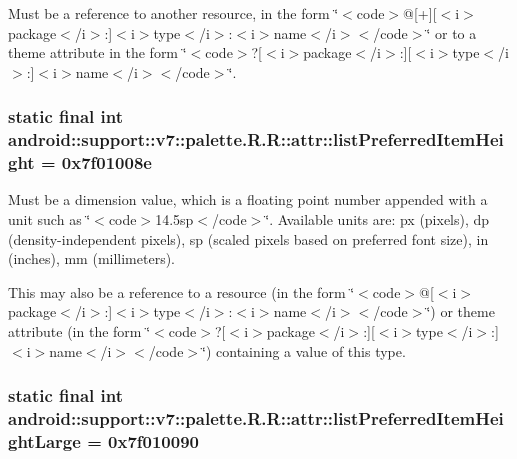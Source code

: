 Must be a reference to another resource, in the form \char`\"{}$<$code$>$@\mbox{[}+\mbox{]}\mbox{[}$<$i$>$package$<$/i$>$:\mbox{]}$<$i$>$type$<$/i$>$:$<$i$>$name$<$/i$>$$<$/code$>$\char`\"{} or to a theme attribute in the form \char`\"{}$<$code$>$?\mbox{[}$<$i$>$package$<$/i$>$:\mbox{]}\mbox{[}$<$i$>$type$<$/i$>$:\mbox{]}$<$i$>$name$<$/i$>$$<$/code$>$\char`\"{}. \hypertarget{classandroid_1_1support_1_1v7_1_1palette_1_1_r_1_1attr_efb12d945093ed3188715f7e5f9ae16a}{
\subsubsection[{listPreferredItemHeight}]{\setlength{\rightskip}{0pt plus 5cm}static final int android::support::v7::palette.R.R::attr::listPreferredItemHeight = 0x7f01008e}}
\label{classandroid_1_1support_1_1v7_1_1palette_1_1_r_1_1attr_efb12d945093ed3188715f7e5f9ae16a}


Must be a dimension value, which is a floating point number appended with a unit such as \char`\"{}$<$code$>$14.5sp$<$/code$>$\char`\"{}. Available units are: px (pixels), dp (density-independent pixels), sp (scaled pixels based on preferred font size), in (inches), mm (millimeters). 

This may also be a reference to a resource (in the form \char`\"{}$<$code$>$@\mbox{[}$<$i$>$package$<$/i$>$:\mbox{]}$<$i$>$type$<$/i$>$:$<$i$>$name$<$/i$>$$<$/code$>$\char`\"{}) or theme attribute (in the form \char`\"{}$<$code$>$?\mbox{[}$<$i$>$package$<$/i$>$:\mbox{]}\mbox{[}$<$i$>$type$<$/i$>$:\mbox{]}$<$i$>$name$<$/i$>$$<$/code$>$\char`\"{}) containing a value of this type. \hypertarget{classandroid_1_1support_1_1v7_1_1palette_1_1_r_1_1attr_f962a0d3bb71796fe00394d06206e8f7}{
\subsubsection[{listPreferredItemHeightLarge}]{\setlength{\rightskip}{0pt plus 5cm}static final int android::support::v7::palette.R.R::attr::listPreferredItemHeightLarge = 0x7f010090}}
\label{classandroid_1_1support_1_1v7_1_1palette_1_1_r_1_1attr_f962a0d3bb71796fe00394d06206e8f7}


